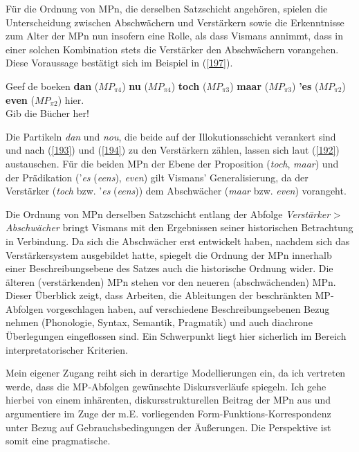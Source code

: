 Für die Ordnung von MPn, die derselben Satzschicht angehören, spielen die Unterscheidung zwischen Abschwächern und Verstärkern sowie die Erkenntnisse zum Alter der MPn nun insofern eine Rolle, als dass Vismans annimmt, dass in einer solchen Kombination stets die Verstärker den Abschwächern vo\-rangehen. Diese Voraussage bestätigt sich im Beispiel in (\ref{197}).
	
\begin{exe}
	\ex\label{197} 
	Geef de boeken \textbf{dan} ($MP_{\pi4}$) \textbf{nu} ($MP_{\pi4}$) \textbf{toch} ($MP_{\pi3}$) \textbf{maar} ($MP_{\pi3}$) \textbf{'es} ($MP_{\pi2}$) \textbf{even} ($MP_{\pi2}$) hier.\\
	Gib die Bücher her!
	\hbox{}\hfill\hbox{\citet[98]{Hoogvliet1903}}
\end{exe}	
Die Partikeln \textit{dan} und \textit{nou}, die beide auf der Illokutionsschicht  verankert sind und nach (\ref{193}) und (\ref{194}) zu den Verstärkern zählen, lassen sich laut (\ref{192}) austauschen. Für die beiden MPn der Ebene der Proposition  (\textit{toch}, \textit{maar}) und der Prädikation  ('\textit{es} (\textit{eens}), \textit{even}) gilt Vismans' Generalisierung, da der Verstärker (\textit{toch} bzw. '\textit{es} (\textit{eens})) dem Abschwächer (\textit{maar} bzw. \textit{even}) vorangeht. 

Die Ordnung von MPn derselben Satzschicht entlang der Abfolge \textit{Verstärker} > \textit{Abschwächer} bringt Vismans mit den Ergebnissen seiner historischen Be\-trachtung in Verbindung. Da sich die Abschwächer erst entwickelt haben, nachdem sich das Verstärkersystem ausgebildet hatte, spiegelt die Ordnung der MPn innerhalb einer Beschreibungsebene des Satzes auch die historische Ordnung wider. Die älteren (verstärkenden) MPn stehen vor den neueren (abschwächenden) MPn.\\

\noindent
Dieser Überblick zeigt, dass Arbeiten, die Ableitungen der beschränkten MP-Abfolgen vorgeschlagen haben, auf verschiedene Beschreibungsebenen Bezug nehmen (Phonologie, Syntax, Semantik, Pragmatik) und auch diachrone Überlegungen eingeflossen sind. Ein Schwerpunkt liegt hier sicherlich im Bereich interpretatorischer Kriterien.

Mein eigener Zugang reiht sich in derartige Modellierungen ein, da ich vertre\-ten werde, dass die MP-Abfolgen gewünschte Diskursverläufe spiegeln. Ich gehe hier\-bei von einem inhärenten, diskursstrukturellen Beitrag der MPn aus und argumentiere im Zuge der m.E. vorliegenden Form-Funktions-Korrespondenz unter Bezug auf Gebrauchsbedingungen der Äußerungen. Die Perspektive ist somit eine pragmatische.

